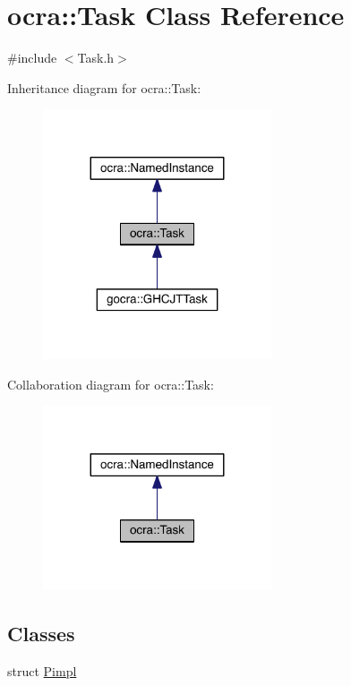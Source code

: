 \hypertarget{classocra_1_1Task}{}\section{ocra\+:\+:Task Class Reference}
\label{classocra_1_1Task}


{\ttfamily \#include $<$Task.\+h$>$}



Inheritance diagram for ocra\+:\+:Task\+:\nopagebreak
\begin{figure}[H]
\begin{center}
\leavevmode
\includegraphics[width=191pt]{dd/d2a/classocra_1_1Task__inherit__graph}
\end{center}
\end{figure}


Collaboration diagram for ocra\+:\+:Task\+:\nopagebreak
\begin{figure}[H]
\begin{center}
\leavevmode
\includegraphics[width=191pt]{dd/d65/classocra_1_1Task__coll__graph}
\end{center}
\end{figure}
\subsection*{Classes}
\begin{DoxyCompactItemize}
\item 
struct \hyperlink{structocra_1_1Task_1_1Pimpl}{Pimpl}
\end{DoxyCompactItemize}
